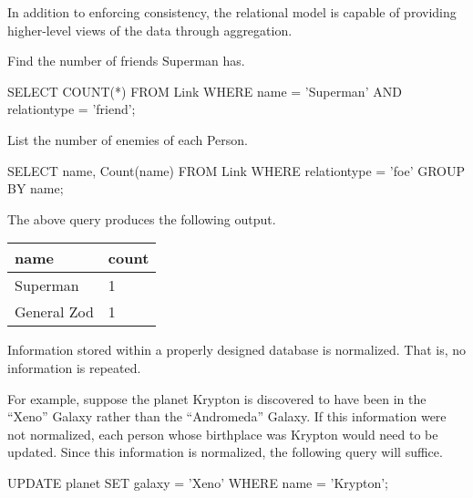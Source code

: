 			In addition to enforcing consistency, the relational model is capable of providing higher-level views of the data through aggregation.
			
			\begin{ex}
				Find the number of friends Superman has.
				
				\begin{singlespaced}
					\begin{sqlcode}
SELECT COUNT(*)
FROM   Link
WHERE  name = 'Superman'
       AND relationtype = 'friend'; 
					\end{sqlcode}
				\end{singlespaced}
			\end{ex}
			
			\begin{ex}
				List the number of enemies of each Person.
				
				\begin{singlespaced}
					\begin{sqlcode}
SELECT name,
       Count(name)
FROM   Link
WHERE  relationtype = 'foe'
GROUP  BY name; 
					\end{sqlcode}
				\end{singlespaced}
				
				The above query produces the following output.
				
				\begin{table}[!ht]
					\centering
					
					\begin{tabular}{ll}
						\toprule
						name & count \\
						\midrule
						Superman & 1 \\
						General Zod & 1 \\
						\bottomrule
					\end{tabular}
				\end{table}
			\end{ex}
			
			Information stored within a properly designed database is normalized.  That is, no information is repeated.
			
			\begin{ex}[Normalization]
				For example, suppose the planet Krypton is discovered to have been in the ``Xeno'' Galaxy rather than the ``Andromeda'' Galaxy.  If this information were not normalized, each person whose birthplace was Krypton would need to be updated.  Since this information is normalized, the following query will suffice.
				
				\begin{singlespaced}
					\begin{sqlcode}
UPDATE planet
SET    galaxy = 'Xeno'
WHERE  name = 'Krypton';
					\end{sqlcode}
				\end{singlespaced}
			\end{ex}
			
